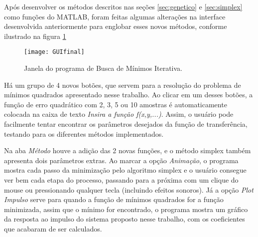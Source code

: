 Após desenvolver os métodos descritos nas seções \ref{sec:genetico} e \ref{sec:simplex} como funções do MATLAB, foram feitas algumas alterações na interface desenvolvida anteriormente \cite{trabalho2} para englobar esses novos métodos, conforme ilustrado na figura \ref{fig:gui}\\

\begin{figure}[H]
	\begin{center}
		\texttt{[image: GUIfinal]}   
		\caption{Janela do programa de Busca de Mínimos Iterativa.}
		\label{fig:gui}
	\end{center}
\end{figure}

\par Há um grupo de 4 novos botões, que servem para a resolução do problema de mínimos quadrados apresentado nesse trabalho. Ao clicar em um desses botões, a função de erro quadrático com 2, 3, 5 ou 10 amostras é automaticamente colocada na caixa de texto \textit{Insira a função f(x,y,...)}. Assim, o usuário pode facilmente tentar encontrar os parâmetros desejados da função de transferência, testando para os diferentes métodos implementados.\\

\par Na aba \textit{Método} houve a adição das 2 novas funções, e o método simplex também apresenta dois parâmetros extras. Ao marcar a opção \textit{Animação}, o programa mostra cada passo da minimização pelo algoritmo simplex e o usuário consegue ver bem cada etapa do processo, passando para a próxima com um clique do mouse ou pressionando qualquer tecla (incluindo efeitos sonoros). Já a opção \textit{Plot Impulso} serve para quando a função de mínimos quadrados for a função minimizada, assim que o mínimo for encontrado, o programa mostra um gráfico da resposta ao impulso do sistema proposto nesse trabalho, com os coeficientes que acabaram de ser calculados.
